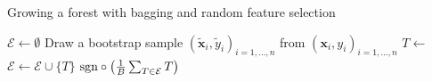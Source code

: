   \begin{algorithm}
    \caption{Growing a forest with bagging and random feature selection} \label{alg:forest}
    \begin{algorithmic}[1]
        \State $\mathcal{E} \gets \emptyset$  
          \State Draw a bootstrap sample $(\tilde{\mathbf{x}}_i, \tilde{y}_i)_{i = 1, \ldots, n}$ from 
            $(\mathbf{x}_i, y_i)_{i = 1, \ldots, n}$
          \State $T \gets$ 
          \State $\mathcal{E} \gets \mathcal{E} \cup \{T\}$
        \EndFor
        \State \Return $\mathrm{sgn} \circ \left( \frac{1}{B} \sum_{T \in \mathcal{E}} T \right)$
      \EndFunction
    \end{algorithmic}
  \end{algorithm}